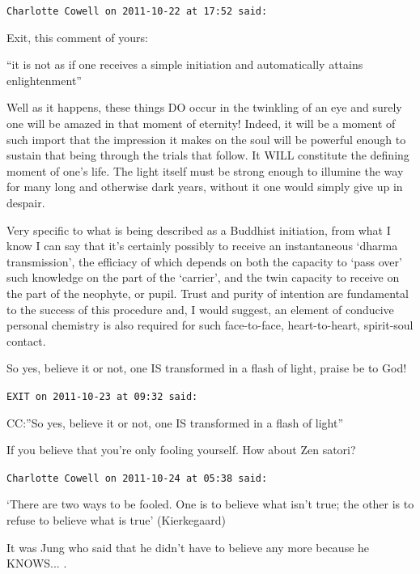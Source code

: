 \begin{footnotesize}
\begin{sffamily}
\hfill

\texttt{Charlotte Cowell on 2011-10-22 at 17:52 said:}

Exit, this comment of yours:

``it is not as if one receives a simple initiation and automatically attains enlightenment''

Well as it happens, these things DO occur in the twinkling of an eye and surely one will be amazed in that moment of eternity! Indeed, it will be a moment of such import that the impression it makes on the soul will be powerful enough to sustain that being through the trials that follow. It WILL constitute the defining moment of one's life. The light itself must be strong enough to illumine the way for many long and otherwise dark years, without it one would simply give up in despair.

Very specific to what is being described as a Buddhist initiation, from what I know I can say that it's certainly possibly to receive an instantaneous `dharma transmission', the efficiacy of which depends on both the capacity to `pass over' such knowledge on the part of the `carrier', and the twin capacity to receive on the part of the neophyte, or pupil. Trust and purity of intention are fundamental to the success of this procedure and, I would suggest, an element of conducive personal chemistry is also required for such face-to-face, heart-to-heart, spirit-soul contact.

So yes, believe it or not, one IS transformed in a flash of light, praise be to God!

\hfill

\texttt{EXIT on 2011-10-23 at 09:32 said:}

CC:''So yes, believe it or not, one IS transformed in a flash of light''

If you believe that you're only fooling yourself. How about Zen satori? 

\hfill

\texttt{Charlotte Cowell on 2011-10-24 at 05:38 said:}

`There are two ways to be fooled. One is to believe what isn't true; the other is to refuse to believe what is true' (Kierkegaard)

It was Jung who said that he didn't have to believe any more because he KNOWS... .


\hfill

\end{sffamily}
\end{footnotesize}

